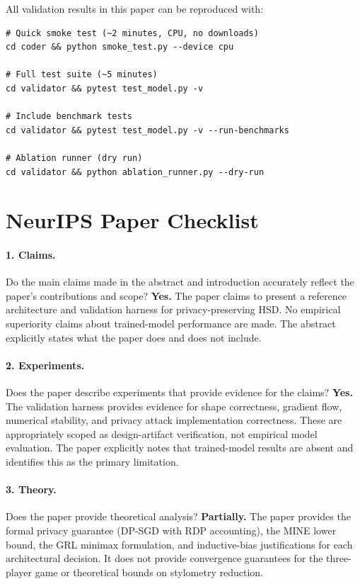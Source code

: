 \documentclass{article}
\begin{document}
All validation results in this paper can be reproduced with:

\begin{verbatim}
# Quick smoke test (~2 minutes, CPU, no downloads)
cd coder && python smoke_test.py --device cpu

# Full test suite (~5 minutes)
cd validator && pytest test_model.py -v

# Include benchmark tests
cd validator && pytest test_model.py -v --run-benchmarks

# Ablation runner (dry run)
cd validator && python ablation_runner.py --dry-run
\end{verbatim}


\newpage
\section*{NeurIPS Paper Checklist}

\paragraph{1. Claims.}
Do the main claims made in the abstract and introduction accurately reflect
the paper's contributions and scope?
\textbf{Yes.}
The paper claims to present a reference architecture and validation harness
for privacy-preserving HSD. No empirical superiority claims about
trained-model performance are made. The abstract explicitly states what
the paper does and does not include.

\paragraph{2. Experiments.}
Does the paper describe experiments that provide evidence for the claims?
\textbf{Yes.}
The validation harness provides evidence for shape correctness, gradient
flow, numerical stability, and privacy attack implementation correctness.
These are appropriately scoped as design-artifact verification, not
empirical model evaluation. The paper explicitly notes that trained-model
results are absent and identifies this as the primary limitation.

\paragraph{3. Theory.}
Does the paper provide theoretical analysis?
\textbf{Partially.}
The paper provides the formal privacy guarantee (DP-SGD with RDP
accounting), the MINE lower bound, the GRL minimax formulation, and
inductive-bias justifications for each architectural decision. It does
not provide convergence guarantees for the three-player game or
theoretical bounds on stylometry reduction.
\end{document}
